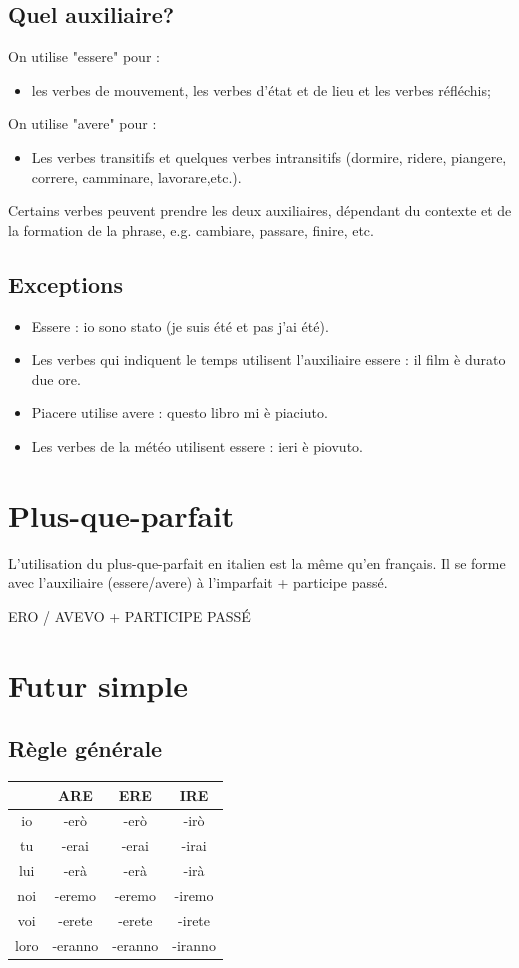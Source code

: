 \documentclass[12pt, openany]{report}
\begin{document}
\subsection{Quel auxiliaire?}
On utilise "essere" pour :
\begin{itemize}
    \item les verbes de mouvement, les verbes d'état et de lieu et les verbes réfléchis;
\end{itemize}
On utilise "avere" pour :
\begin{itemize}
    \item Les verbes transitifs et quelques verbes intransitifs (dormire, ridere, piangere, correre, camminare, lavorare,etc.).
\end{itemize} 
Certains verbes peuvent prendre les deux auxiliaires, dépendant du contexte et de la formation de la phrase, e.g. cambiare, passare, finire, etc. 
\subsection{Exceptions}
\begin{itemize}
    \item Essere : io sono stato (je suis été et pas j'ai été).
    \item Les verbes qui indiquent le temps utilisent l'auxiliaire essere : il film è durato due ore.
    \item Piacere utilise avere : questo libro mi è piaciuto.
    \item Les verbes de la météo utilisent essere : ieri è piovuto.
\end{itemize}
\section{Plus-que-parfait}
L'utilisation du plus-que-parfait en italien est la même qu'en français. Il se forme avec l'auxiliaire (essere/avere) à l'imparfait + participe passé.
\begin{center}
    ERO / AVEVO + PARTICIPE PASSÉ
\end{center}
\section{Futur simple}
\subsection{Règle générale}
\begin{center}
    \begin{tabular}{c|c|c|c}
        & ARE & ERE & IRE\\ \hline
        io & -erò & -erò & -irò\\
        tu & -erai & -erai & -irai\\
        lui & -erà & -erà & -irà\\
        noi & -eremo & -eremo & -iremo\\
        voi & -erete & -erete & -irete\\
        loro & -eranno & -eranno & -iranno\\
    \end{tabular}
\end{center} 
\end{document}

